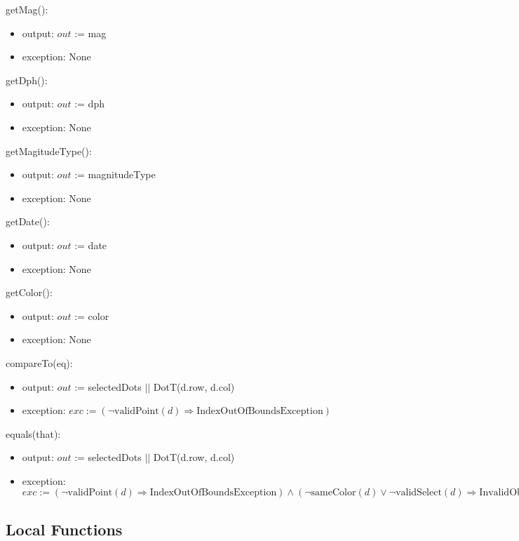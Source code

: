 \documentclass[12pt]{article}
\begin{document}
\noindent getMag():
\begin{itemize}
\item output: $out$ := mag
\item exception: None
\end{itemize}

\noindent getDph():
\begin{itemize}
\item output: $out$ := dph
\item exception: None
\end{itemize}

\noindent getMagitudeType():
\begin{itemize}
\item output: $out$ := magnitudeType
\item exception: None
\end{itemize}

\noindent getDate():
\begin{itemize}
\item output: $out$ := date
\item exception: None
\end{itemize}

\noindent getColor():
\begin{itemize}
\item output: $out$ := color
\item exception: None
\end{itemize}

\noindent compareTo(eq):
\begin{itemize}
\item output: $out$ := selectedDots $||$ DotT(d.row, d.col)
\item exception: $exc := (\neg \mbox{validPoint}(d) \Rightarrow \mbox{IndexOutOfBoundsException})$
\end{itemize}

\noindent equals(that):
\begin{itemize}
\item output: $out$ := selectedDots $||$ DotT(d.row, d.col)
\item exception: $exc := (\neg \mbox{validPoint}(d) \Rightarrow \mbox{IndexOutOfBoundsException})
\wedge (\neg \mbox{sameColor}(d) \vee \neg \mbox{validSelect}(d) \Rightarrow \mbox{InvalidObjectException})$
\end{itemize}

\newpage

\subsection*{Local Functions}
\end{document}
